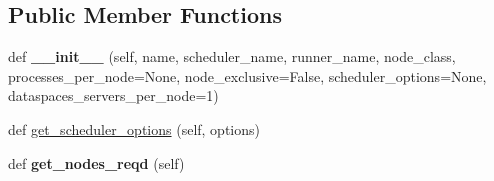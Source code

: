 \subsection*{Public Member Functions}
\begin{DoxyCompactItemize}
\item 
\mbox{\label{classcodar_1_1savanna_1_1machines_1_1_machine_a604279a4e666c75e59716eefc01be972}} 
def {\bfseries \+\_\+\+\_\+init\+\_\+\+\_\+} (self, name, scheduler\+\_\+name, runner\+\_\+name, node\+\_\+class, processes\+\_\+per\+\_\+node=None, node\+\_\+exclusive=False, scheduler\+\_\+options=None, dataspaces\+\_\+servers\+\_\+per\+\_\+node=1)
\item 
def \hyperlink{classcodar_1_1savanna_1_1machines_1_1_machine_a50a9259a741eef79d1de2529a9d1f1ae}{get\+\_\+scheduler\+\_\+options} (self, options)
\item 
\mbox{\label{classcodar_1_1savanna_1_1machines_1_1_machine_a13cd507ffb654ef95477f9cd22de6691}} 
def {\bfseries get\+\_\+nodes\+\_\+reqd} (self)
\end{DoxyCompactItemize}

